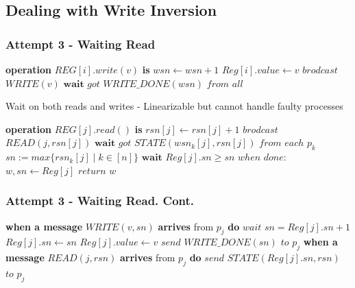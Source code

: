 \subsection{Dealing with Write Inversion}
\begin{frame}[fragile]
    \frametitle{Attempt 3 - Waiting Read}
    \begin{algorithm}[H]
        \begin{algorithmic}[0]
            \STATE \textbf{operation} $REG[i].write(v)$ \textbf{is}
            \bindent
                \STATE $wsn\leftarrow wsn+1$
                \STATE $Reg[i].value \leftarrow v$
                \STATE $brodcast$ $WRITE(v)$
                \STATE $\textbf{wait}$ $got$ $WRITE\_DONE(wsn)$ $from$ $all$
            \eindent
        \end{algorithmic}
        \caption{Wait on both reads and writes -
            Linearizable but cannot handle faulty processes}
        \begin{algorithmic}[0]
            \STATE \textbf{operation} $REG[j].read()$ \textbf{is}
            \bindent
                \STATE $rsn[j]\leftarrow rsn[j]+1$
                \STATE $brodcast$ $READ(j, rsn[j])$
                \STATE $\textbf{wait}$ $got$ $STATE(wsn_k[j], rsn[j])$ $from$ $each$ $p_k$
                \STATE $sn := max\{rsn_k[j]\mid k\in[n]\}$
                \STATE $\textbf{wait}$ $Reg[j].sn \geq sn$
                \STATE $when$ $done:$ $w, sn \leftarrow Reg[j]$
                \STATE $return$ $w$
            \eindent
        \end{algorithmic}
    \end{algorithm}
\end{frame}

\begin{frame}[fragile]
    \frametitle{Attempt 3 - Waiting Read. Cont.}
    \begin{algorithm}[H]
        \begin{algorithmic}[0]
        \STATE \textbf{when a message} $WRITE(v, sn)$ \textbf{arrives} from $p_j$ \textbf{do}
        \bindent
            \STATE $wait$ $sn = Reg[j].sn+1$
            \STATE $Reg[j].sn \leftarrow sn$
            \STATE $Reg[j].value \leftarrow v$
            \STATE $send$ $WRITE\_DONE(sn)$ $to$ $p_j$
        \eindent
        \STATE \textbf{when a message} $READ(j, rsn)$ \textbf{arrives} from $p_j$ \textbf{do}
        \bindent
            \STATE $send$ $STATE(Reg[j].sn, rsn)$ $to$ $p_j$
        \eindent
    \end{algorithmic}
        \caption*{}
    \end{algorithm}
\end{frame}


